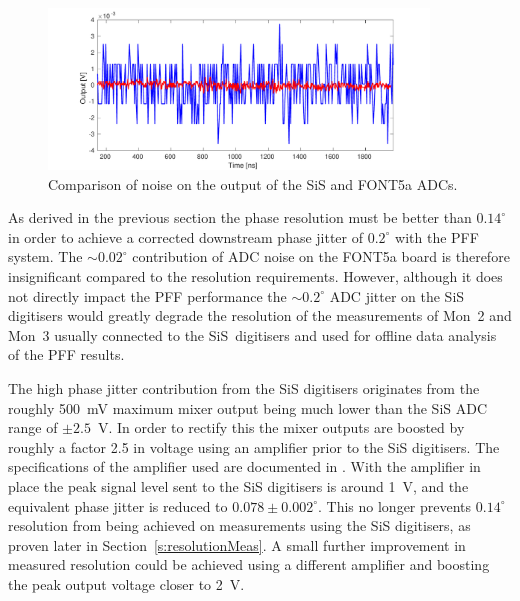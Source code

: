 \begin{figure}
  \centering
  \includegraphics[width=0.9\textwidth]{Figures/phaseMons/digitiserNosie}
  \caption{Comparison of noise on the output of the SiS and FONT5a ADCs.}
  \label{f:digitiserNosie}
\end{figure}

As derived in the previous section the phase resolution must be better than \(0.14^\circ\) in order to achieve a corrected downstream phase jitter of \(0.2^\circ\) with the PFF system. The \(\sim0.02^\circ\) contribution of ADC noise on the FONT5a board is therefore insignificant compared to the resolution requirements. However, although it does not directly impact the PFF performance the \(\sim0.2^\circ\) ADC jitter on the SiS digitisers would greatly degrade the resolution of the measurements of Mon~2 and Mon~3 usually connected to the SiS~digitisers and used for offline data analysis of the PFF results. 

The high phase jitter contribution from the SiS digitisers originates from the roughly 500~mV maximum mixer output being much lower than the SiS ADC range of \(\pm2.5\)~V. In order to rectify this the mixer outputs are boosted by roughly a factor 2.5 in voltage using an amplifier prior to the SiS digitisers. The specifications of the amplifier used are documented in \cite{ampSiS}. With the amplifier in place the peak signal level sent to the SiS digitisers is around 1~V, and the equivalent phase jitter is reduced to \(0.078\pm0.002^\circ\). This no longer prevents \(0.14^\circ\) resolution from being achieved on measurements using the SiS digitisers, as proven later in Section~\ref{s:resolutionMeas}. A small further improvement in measured resolution could be achieved using a different amplifier and boosting the peak output voltage closer to 2~V.

